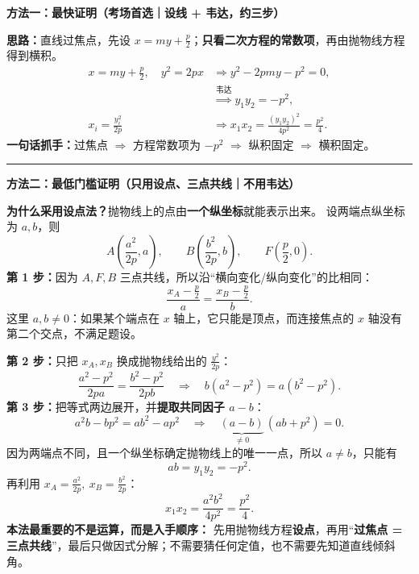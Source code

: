 \begin{proofbox}
\textbf{\textcolor{CProof}{方法一：最快证明（考场首选｜设线 + 韦达，约三步）}}\par\smallskip
\textbf{思路：}直线过焦点，先设 $x=my+\frac p2$；\textbf{只看二次方程的常数项}，再由抛物线方程得到横积。
\[
 \begin{aligned}
 x=my+\frac p2,\quad y^2=2px
 &\Longrightarrow y^2-2pmy-p^2=0,\\
 &\overset{\text{韦达}}{\Longrightarrow}
 \boxed{y_1y_2=-p^2},\\[2pt]
 x_i=\frac{y_i^2}{2p}
 &\Longrightarrow
 \boxed{x_1x_2=\frac{(y_1y_2)^2}{4p^2}=\frac{p^2}{4}}.
 \end{aligned}
\]
\textbf{一句话抓手：}过焦点 $\Rightarrow$ 方程常数项为 $-p^2$
$\Rightarrow$ 纵积固定 $\Rightarrow$ 横积固定。

\medskip\hrule\medskip
\textbf{\textcolor{CProof}{方法二：最低门槛证明（只用设点、三点共线｜不用韦达）}}\par\smallskip
\textbf{为什么采用设点法？}抛物线上的点由\textbf{一个纵坐标}就能表示出来。
设两端点纵坐标为 $a,b$，则
\[
 A\!\left(\frac{a^2}{2p},a\right),\qquad
 B\!\left(\frac{b^2}{2p},b\right),\qquad
 F\!\left(\frac p2,0\right).
\]
\textbf{第 1 步：}因为 $A,F,B$ 三点共线，所以沿“横向变化/纵向变化”的比相同：
\[
 \frac{x_A-\frac p2}{a}
 =\frac{x_B-\frac p2}{b}.
\]
这里 $a,b\ne0$：如果某个端点在 $x$ 轴上，它只能是顶点，而连接焦点的 $x$ 轴没有第二个交点，不满足题设。

\textbf{第 2 步：}只把 $x_A,x_B$ 换成抛物线给出的 $\frac{y^2}{2p}$：
\[
 \frac{a^2-p^2}{2pa}=\frac{b^2-p^2}{2pb}
 \quad\Longrightarrow\quad
 b(a^2-p^2)=a(b^2-p^2).
\]
\textbf{第 3 步：}把等式两边展开，并\textbf{提取共同因子 $a-b$}：
\[
 a^2b-bp^2=ab^2-ap^2
 \quad\Longrightarrow\quad
 \underbrace{(a-b)}_{\ne0}\,(ab+p^2)=0.
\]
因为两端点不同，且一个纵坐标确定抛物线上的唯一一点，所以 $a\ne b$，只能有
\[
 \boxed{ab=y_1y_2=-p^2}.
\]
再利用 $x_A=\frac{a^2}{2p},\ x_B=\frac{b^2}{2p}$：
\[
 \boxed{x_1x_2=\frac{a^2b^2}{4p^2}=\frac{p^2}{4}}.
\]
\textbf{本法最重要的不是运算，而是入手顺序：}
先用抛物线方程\textbf{设点}，再用“\textbf{过焦点 = 三点共线}”，最后只做因式分解；不需要猜任何定值，也不需要先知道直线倾斜角。


\end{proofbox}

